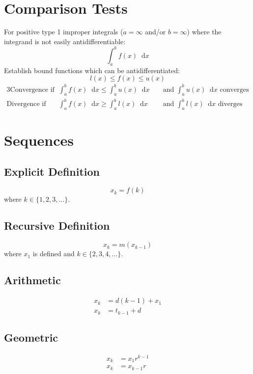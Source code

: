 \documentclass[12pt]{article}
\newcommand*{\D}[1]{\mathop{}\!\mathrm{d}#1}
\newcommand*{\fixmath}{%
  \makebox{}\vspace{\glueexpr-\baselineskip-\abovedisplayskip}}
\newenvironment{fixaskip}{\setlength{\abovedisplayskip}{0pt}\fixmath%
  \ignorespaces}{\ignorespacesafterend}
\newenvironment{fixskip}{\setlength{\abovedisplayskip}{0pt}%
  \setlength{\belowdisplayskip}{0pt}\fixmath\ignorespaces}%
  {\ignorespacesafterend}
\begin{document}
\section*{Comparison Tests}
For positive type 1 improper integrals (\(a = \infty\) and\slash or
\(b = \infty\)) where the integrand is not easily antidifferentiable:
\[
  \int_a^b f(x) \D{x}
\]
Establish bound functions which can be antidifferentiated:
\[
  l(x) \le f(x) \le u(x)
\]
\begin{fixskip}
  \begin{alignat*}{3}
    \text{Convergence if } &\int_a^b f(x) \D{x} \le \int_a^b u(x) \D{x}
      &&\text{ and } \int_a^b u(x) \D{x} \text{ converges}\\
    \text{Divergence if } &\int_a^b f(x) \D{x} \ge \int_a^b l(x) \D{x}
      &&\text{ and } \int_a^b l(x) \D{x} \text{ diverges}
  \end{alignat*}
\end{fixskip}
\section*{Sequences}
\subsection*{Explicit Definition}
\begin{fixaskip}
  \[
    x_k = f(k)
  \]
\end{fixaskip}
where \(k \in \{1,2,3,\dots\}\).
\subsection*{Recursive Definition}
\begin{fixaskip}
  \[
    x_k = m(x_{k-1})
  \]
\end{fixaskip}
where \(x_1\) is defined and \(k \in \{2,3,4,\dots\}\).
\subsection*{Arithmetic}
\begin{fixskip}
  \begin{align*}
    x_k &= d(k-1) + x_1\\
    x_k &= t_{k-1} + d
  \end{align*}
\end{fixskip}
\subsection*{Geometric}
\begin{fixskip}
  \begin{align*}
    x_k &= x_1r^{k-1}\\
    x_k &= x_{k-1} r
  \end{align*}
\end{fixskip}
\end{document}
